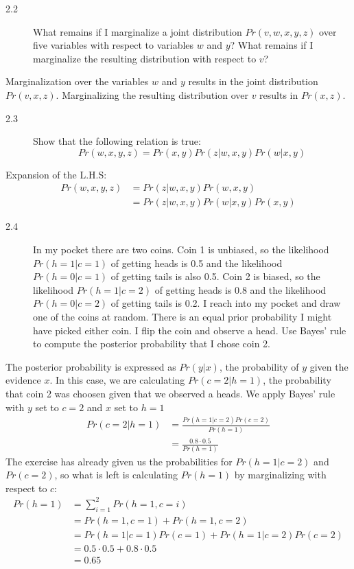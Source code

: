 \documentclass[10pt,a4paper]{article}
\newenvironment{prob}[1]%
   {%
    \begin{description}\item[#1]}%
   {\end{description}}
\begin{document}
\begin{prob}{2.2}
  What remains if I marginalize a joint distribution $Pr(v, w, x, y, z)$ over five
  variables with respect to variables $w$ and $y$? What remains if I marginalize the resulting
  distribution with respect to $v$?
\end{prob}
Marginalization over the variables $w$ and $y$ results in the joint
distribution $Pr(v, x, z)$. Marginalizing the resulting distribution
over $v$ results in $Pr(x, z)$.
\begin{prob}{2.3}
  Show that the following relation is true:
  \begin{equation}
    Pr(w, x, y, z) = Pr(x, y)Pr(z|w, x, y)Pr(w|x, y)
  \end{equation}
\end{prob}
Expansion of the L.H.S:
\begin{align}
  Pr(w, x, y, z) &= Pr(z|w,x,y)Pr(w,x,y)\\ &= Pr(z|w,x,y)Pr(w|x,y)Pr(x,y)
\end{align}
\begin{prob}{2.4}
  In my pocket there are two coins. Coin 1 is unbiased, so the
  likelihood $Pr(h = 1|c = 1)$ of getting heads is 0.5 and the
  likelihood $Pr(h = 0|c = 1)$ of getting tails is also 0.5. Coin 2 is
  biased, so the likelihood $Pr(h = 1|c = 2)$ of getting heads is 0.8
  and the likelihood $Pr(h = 0|c = 2)$ of getting tails is 0.2. I
  reach into my pocket and draw one of the coins at random. There is
  an equal prior probability I might have picked either coin. I flip
  the coin and observe a head. Use Bayes' rule to compute the
  posterior probability that I chose coin 2.
\end{prob}
The posterior probability is expressed as $Pr(y|x)$, the probability
of $y$ given the evidence $x$. In this case, we are calculating $Pr(c
= 2|h = 1)$, the probability that coin 2 was choosen given that we
observed a heads. We apply Bayes' rule with $y$ set to $c = 2$ and $x$
set to $h = 1$
\begin{align}
  Pr(c = 2|h = 1) &= \frac{Pr(h=1|c=2)Pr(c=2)}{Pr(h=1)}\\
  &=\frac{0.8\cdot0.5}{Pr(h=1)}
\end{align}
The exercise has already given us the probabilities for $Pr(h=1|c=2)$
and $Pr(c=2)$, so what is left is calculating $Pr(h=1)$ by
marginalizing with respect to $c$:
\begin{align}
  Pr(h=1) &= \sum^2_{i=1}Pr(h=1, c=i)\\
  &= Pr(h=1,c=1) + Pr(h=1,c=2)\\
  &= Pr(h=1|c=1)Pr(c=1) + Pr(h=1|c=2)Pr(c=2)\\
  &= 0.5\cdot0.5 + 0.8\cdot0.5\\
  &= 0.65
\end{align}
\end{document}
